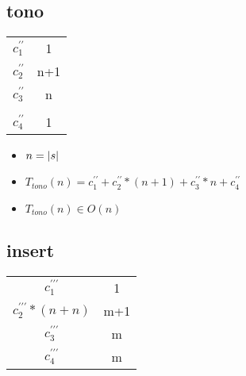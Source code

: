 \documentclass{article}
\begin{document}
    \subsection*{tono}

    \begin{minipage}{0.70\textwidth}
        
    \end{minipage}
    \hfill
    \begin{minipage}{0.25\textwidth}
        \begin{tabular}{|c|c}

            $c^{\prime\prime}_1$ & 1 \\
            $c^{\prime\prime}_2$ & n+1 \\
            $c^{\prime\prime}_3$ & n \\
            $                  $ &   \\
            $c^{\prime\prime}_4$ & 1 \\

        \end{tabular}
    \end{minipage}

    \begin{itemize}
        \item $n = |s|$
        \item $T_{tono}(n) = c^{\prime\prime}_1 + c^{\prime\prime}_2 * (n + 1) + c^{\prime\prime}_3 * n + c^{\prime\prime}_4 $
        \item $T_{tono}(n) \in O(n)$
    \end{itemize}

    \subsection*{insert}

    \begin{minipage}{0.70\textwidth}
        
    \end{minipage}
    \hfill
    \begin{minipage}{0.25\textwidth}
        \begin{tabular}{|c|c}
            $c^{\prime\prime\prime}_1$ & 1 \\
            $c^{\prime\prime\prime}_2*(n+n)$ & m+1 \\
            $c^{\prime\prime\prime}_3$ & m \\
            $c^{\prime\prime\prime}_4$ & m \\
        \end{tabular}
    \end{minipage}
\end{document}
